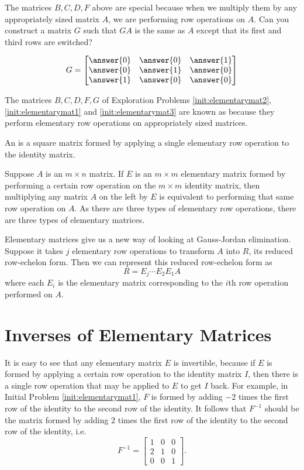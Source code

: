 \documentclass{ximera}
\begin{document}
 
\begin{initprob}\label{init:elementarymat3}
 The matrices $B,C,D,F$ above are special because when we multiply them by any appropriately sized matrix $A$, we are performing row operations on $A$.  Can you construct a matrix $G$ such that $GA$ is the same as $A$ except that its first and third rows are switched?
 
 $$G=\begin{bmatrix}\answer{0} & \answer{0} & \answer{1} \\ \answer{0} & \answer{1} & \answer{0}\\ \answer{1} & \answer{0} & \answer{0}\end{bmatrix}$$

\end{initprob}


The matrices $B,C,D, F, G$ of Exploration Problems \ref{init:elementarymat2}, \ref{init:elementarymat1} and \ref{init:elementarymat3} are known as  because they perform elementary row operations on appropriately sized matrices.

\begin{definition} 
  
An  is a square matrix formed by applying a single elementary row operation to the identity matrix.
  
\end{definition}

Suppose $A$ is an $m \times n$ matrix.  If $E$ is an $m \times m$ elementary matrix formed by performing a certain row operation on the $m \times m$ identity matrix, then multiplying any matrix $A$ on the left by $E$ is equivalent to performing that same row operation on $A$.  As there are three types of elementary row operations, there are three types of elementary matrices.

Elementary matrices give us a new way of looking at Gauss-Jordan elimination.  Suppose it takes $j$ elementary row operations to transform $A$ into $R$, its reduced row-echelon form.  Then we can represent this reduced row-echelon form as
$$R = E_j \cdots E_2 E_1 A$$
where each $E_i$ is the elementary matrix corresponding to the $i$th row operation performed on $A$.  

\section*{Inverses of Elementary Matrices}

It is easy to see that any elementary matrix $E$ is invertible, because if $E$ is formed by applying a certain row operation to the identity matrix $I$, then there is a single row operation that may be applied to $E$ to get $I$ back.  For example, in Initial Problem \ref{init:elementarymat1}, $F$ is formed by adding $-2$ times the first row of the identity to the second row of the identity.  It follows that $F^{-1}$ should be the matrix formed by adding $2$ times the first row of the identity to the second row of the identity, i.e.
 $$F^{-1} =  \begin{bmatrix}  
 1&0&0\\2&1&0\\0&0&1
 \end{bmatrix}.
$$
\end{document}
